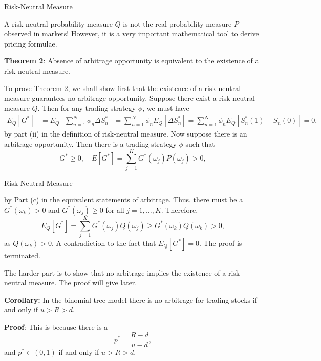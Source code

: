 \documentclass{beamer}
\begin{document}
\begin{frame}{Risk-Neutral Measure}

    {\footnotesize \footnotesize
    \par A risk neutral probability measure $Q$ is not the real probability 
    measure $P$ observed in markets! 
    However, it is a very important mathematical tool to derive pricing formulae. 
    \vspace{1em}
    \par  \pause \textbf{Theorem 2}: Absence of arbitrage opportunity is equivalent 
    to the existence of a risk-neutral measure.
    \vspace{1em}
    \par  \pause To prove Theorem 2, we shall show first that the existence of a risk neutral measure guarantees no arbitrage opportunity. Suppose there exist a risk-neutral measure $Q$. Then for any trading strategy $\phi$, we must have
    \begin{align*}
    E_Q[G^*] &= E_Q\left[\sum_{n=1}^N \phi_n \Delta S_n^*\right] = \sum_{n=1}^N \phi_n E_Q[\Delta S_n^*] 
    = \sum_{n=1}^N \phi_n E_Q[S_n^*(1) - S_n(0)] = 0,
    \end{align*}
     \pause by part (ii) in the definition of risk-neutral measure. Now suppose there is an arbitrage opportunity. Then there is a trading strategy $\phi$ such that
    \[
    G^* \geq 0, \quad E[G^*] = \sum_{j=1}^K G^*(\omega_j) P(\omega_j) > 0,
    \]
    }
\end{frame}

\begin{frame}{Risk-Neutral Measure}

    {\footnotesize \footnotesize
        by Part (c) in the equivalent statements of arbitrage. Thus, there must be a $G^*(\omega_k) > 0$ and $G^*(\omega_j) \geq 0$ for all $j = 1, \ldots, K$. Therefore,
    \[
    E_Q[G^*] = \sum_{j=1}^K G^*(\omega_j) Q(\omega_j) \geq G^*(\omega_k) Q(\omega_k) > 0,
    \]
    as $Q(\omega_k) > 0$. A contradiction to the fact that $E_Q[G^*] = 0$. The proof is terminated.

    The harder part is to show that no arbitrage 
    implies the existence of a risk neutral measure. The proof will give later.
    \vspace{1em}

    \par  \pause \textbf{Corollary:} In the binomial tree model there is no arbitrage 
    for trading stocks if and only if $u > R > d$.
    \vspace{1em}
    \par \textbf{Proof}: This is because there is a
    \[
    p^* = \frac{R - d}{u - d},
    \]
    and $p^* \in (0, 1)$ if and only if $u > R > d$.
    }
\end{frame}
\end{document}
